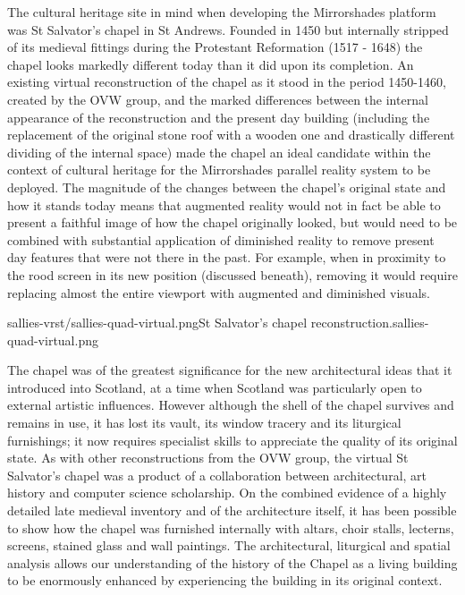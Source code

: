 The cultural heritage site in mind when developing the Mirrorshades platform was St Salvator's chapel in St Andrews. Founded in 1450 but internally stripped of its medieval fittings during the Protestant Reformation (1517 - 1648) the chapel looks markedly different today than it did upon its completion. An existing virtual reconstruction of the chapel as it stood in the period 1450-1460, created by the OVW group, and the marked differences between the internal appearance of the reconstruction and the present day building (including the replacement of the original stone roof with a wooden one and drastically different dividing of the internal space) made the chapel an ideal candidate within the context of cultural heritage for the Mirrorshades parallel reality system to be deployed. The magnitude of the changes between the chapel's original state and how it stands today means that augmented reality would not in fact be able to present a faithful image of how the chapel originally looked, but would need to be combined with substantial application of diminished reality to remove present day features that were not there in the past. For example, when in proximity to the rood screen in its new position (discussed beneath), removing it would require replacing almost the entire viewport with augmented and diminished visuals.

       {sallies-vrst/sallies-quad-virtual.png}{St Salvator's chapel reconstruction.}{sallies-quad-virtual.png}
       
The chapel was of the greatest significance for the new architectural ideas that it introduced into Scotland, at a time when Scotland was particularly open to external artistic influences. However although the shell of the chapel survives and remains in use, it has lost its vault, its window tracery and its liturgical furnishings; it now requires specialist skills to appreciate the quality of its original state. As with other reconstructions from the OVW group, the virtual St Salvator's chapel was a product of a collaboration between architectural, art history and computer science scholarship. On the combined evidence of a highly detailed late medieval inventory and of the architecture itself, it has been possible to show how the chapel was furnished internally with altars, choir stalls, lecterns, screens, stained glass and wall paintings. The architectural, liturgical and spatial analysis allows our understanding of the history of the Chapel as a living building to be enormously enhanced by experiencing the building in its original context.

